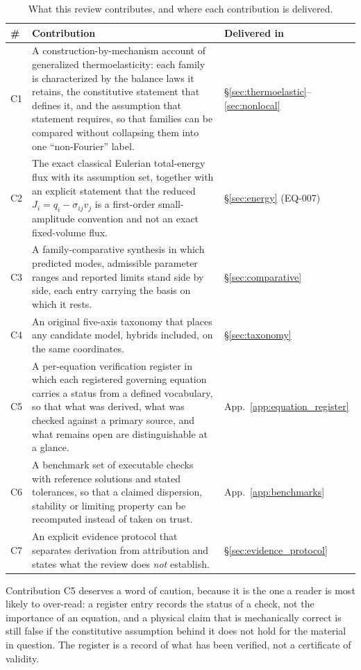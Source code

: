 \begin{table}[H]
\centering
\small
\caption{What this review contributes, and where each contribution is delivered.}
\label{tab:contributions}
\begin{tabularx}{\textwidth}{@{}p{0.55cm}Y p{2.35cm}@{}}
\toprule
\textbf{\#} & \textbf{Contribution} & \textbf{Delivered in} \\
\midrule
C1 & A construction-by-mechanism account of generalized thermoelasticity: each family is characterized by the balance laws it retains, the constitutive statement that defines it, and the assumption that statement requires, so that families can be compared without collapsing them into one ``non-Fourier'' label. & \S\ref{sec:thermoelastic}--\ref{sec:nonlocal} \\
C2 & The exact classical Eulerian total-energy flux with its assumption set, together with an explicit statement that the reduced $J_i=q_i-\sigma_{ij}v_j$ is a first-order small-amplitude convention and not an exact fixed-volume flux. & \S\ref{sec:energy} (EQ-007) \\
C3 & A family-comparative synthesis in which predicted modes, admissible parameter ranges and reported limits stand side by side, each entry carrying the basis on which it rests. & \S\ref{sec:comparative} \\
C4 & An original five-axis taxonomy that places any candidate model, hybrids included, on the same coordinates. & \S\ref{sec:taxonomy} \\
C5 & A per-equation verification register in which each registered governing equation carries a status from a defined vocabulary, so that what was derived, what was checked against a primary source, and what remains open are distinguishable at a glance. & App.~\ref{app:equation_register} \\
C6 & A benchmark set of executable checks with reference solutions and stated tolerances, so that a claimed dispersion, stability or limiting property can be recomputed instead of taken on trust. & App.~\ref{app:benchmarks} \\
C7 & An explicit evidence protocol that separates derivation from attribution and states what the review does \emph{not} establish. & \S\ref{sec:evidence_protocol} \\
\bottomrule
\end{tabularx}
\end{table}

Contribution C5 deserves a word of caution, because it is the one a reader is most likely to over-read: a register entry records the status of a check, not the importance of an equation, and a physical claim that is mechanically correct is still false if the constitutive assumption behind it does not hold for the material in question. The register is a record of what has been verified, not a certificate of validity.

